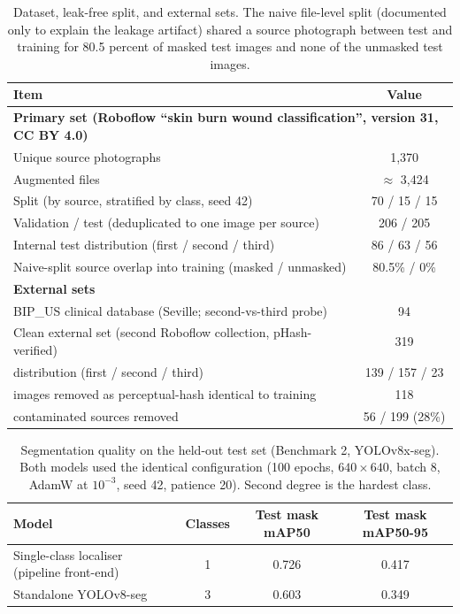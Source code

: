\documentclass{elektr}
\newcommand{\vs}{\vspace}
\begin{document}
\begin{table}[!ht]
\caption{Dataset, leak-free split, and external sets. The naive file-level split (documented only to explain the leakage artifact) shared a source photograph between test and training for 80.5 percent of masked test images and none of the unmasked test images.}
\begin{center}
\small
\begin{tabular}{|l|c|}
\hline
Item & Value \\
\hline
\multicolumn{2}{|l|}{\textbf{Primary set (Roboflow ``skin burn wound classification'', version 31, CC BY 4.0)}} \\
\hline
Unique source photographs & 1{,}370 \\
Augmented files & $\approx$ 3{,}424 \\
Split (by source, stratified by class, seed 42) & 70 / 15 / 15 \\
Validation / test (deduplicated to one image per source) & 206 / 205 \\
Internal test distribution (first / second / third) & 86 / 63 / 56 \\
Naive-split source overlap into training (masked / unmasked) & 80.5\% / 0\% \\
\hline
\multicolumn{2}{|l|}{\textbf{External sets}} \\
\hline
BIP\_US clinical database (Seville; second-vs-third probe) & 94 \\
Clean external set (second Roboflow collection, pHash-verified) & 319 \\
\quad distribution (first / second / third) & 139 / 157 / 23 \\
\quad images removed as perceptual-hash identical to training & 118 \\
\quad contaminated sources removed & 56 / 199 (28\%) \\
\hline
\end{tabular}
\label{tab:data}
\end{center}\vs{-4mm}
\end{table}


\begin{table}[!ht]
\caption{Segmentation quality on the held-out test set (Benchmark 2, YOLOv8x-seg). Both models used the identical configuration (100 epochs, $640\times640$, batch 8, AdamW at $10^{-3}$, seed 42, patience 20). Second degree is the hardest class.}
\begin{center}
\small
\begin{tabular}{|l|c|c|c|}
\hline
Model & Classes & Test mask mAP50 & Test mask mAP50-95 \\
\hline
Single-class localiser (pipeline front-end) & 1 & 0.726 & 0.417 \\
Standalone YOLOv8-seg & 3 & 0.603 & 0.349 \\
\hline
\end{tabular}
\label{tab:seg}
\end{center}\vs{-4mm}
\end{table}
\end{document}
